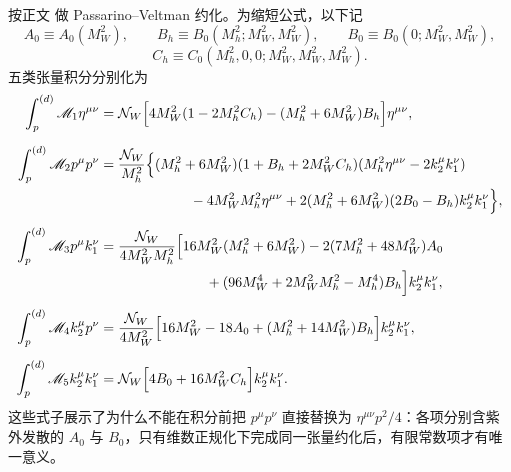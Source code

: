 \begin{derivation}
按正文 做 Passarino--Veltman 约化。为缩短公式，以下记
\begin{equation*}
 A_0\equiv A_0(M_W^2),\qquad
 B_h\equiv B_0(M_h^2;M_W^2,M_W^2),\qquad
 B_0\equiv B_0(0;M_W^2,M_W^2),
\end{equation*}
\begin{equation*}
 C_h\equiv C_0(M_h^2,0,0;M_W^2,M_W^2,M_W^2).
\end{equation*}
五类张量积分分别化为
\begin{align*}
\int_p^{(d)}\mathscr M_1\eta^{\mu\nu}
={}&\mathcal N_W
\Bigl[4M_W^2(1-2M_h^2C_h)-(M_h^2+6M_W^2)B_h\Bigr]\eta^{\mu\nu},\\[2mm]
\int_p^{(d)}\mathscr M_2p^\mu p^\nu
={}&\frac{\mathcal N_W}{M_h^2}
\Bigl\{
(M_h^2+6M_W^2)(1+B_h+2M_W^2C_h)
(M_h^2\eta^{\mu\nu}-2k_2^\mu k_1^\nu)\\
&\hspace{18mm}-4M_W^2M_h^2\eta^{\mu\nu}
+2(M_h^2+6M_W^2)(2B_0-B_h)k_2^\mu k_1^\nu
\Bigr\},\\[2mm]
\int_p^{(d)}\mathscr M_3p^\mu k_1^\nu
={}&\frac{\mathcal N_W}{4M_W^2M_h^2}
\Bigl[
16M_W^2(M_h^2+6M_W^2)
-2(7M_h^2+48M_W^2)A_0\\
&\hspace{22mm}+(96M_W^4+2M_W^2M_h^2-M_h^4)B_h
\Bigr]k_2^\mu k_1^\nu,\\[2mm]
\int_p^{(d)}\mathscr M_4k_2^\mu p^\nu
={}&\frac{\mathcal N_W}{4M_W^2}
\Bigl[16M_W^2-18A_0+(M_h^2+14M_W^2)B_h\Bigr]k_2^\mu k_1^\nu,\\[2mm]
\int_p^{(d)}\mathscr M_5k_2^\mu k_1^\nu
={}&\mathcal N_W\Bigl[4B_0+16M_W^2C_h\Bigr]k_2^\mu k_1^\nu.
\end{align*}
这些式子展示了为什么不能在积分前把 $p^\mu p^\nu$ 直接替换为 $\eta^{\mu\nu}p^2/4$：各项分别含紫外发散的 $A_0$ 与 $B_0$，只有维数正规化下完成同一张量约化后，有限常数项才有唯一意义。


\end{derivation}
